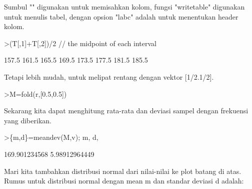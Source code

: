 \documentclass{article}
\begin{document}
\begin{eulernotebook}
\begin{eulercomment}
\begin{eulercomment}
\begin{eulercomment}
Sumbul "\textbar{}" digunakan untuk memisahkan kolom, fungsi "writetable"
digunakan untuk menulis tabel, dengan opsion "labc" adalah untuk
menentukan header kolom.
\end{eulercomment}
\begin{eulerprompt}
>(T[,1]+T[,2])/2 // the midpoint of each interval
\end{eulerprompt}
\begin{euleroutput}
          157.5 
          161.5 
          165.5 
          169.5 
          173.5 
          177.5 
          181.5 
          185.5 
\end{euleroutput}
\begin{eulercomment}
Tetapi lebih mudah, untuk melipat rentang dengan vektor [1/2.1/2].
\end{eulercomment}
\begin{eulerprompt}
>M=fold(r,[0.5,0.5])
\end{eulerprompt}
\begin{euleroutput}
  [157.5,  161.5,  165.5,  169.5,  173.5,  177.5,  181.5,  185.5]
\end{euleroutput}
\begin{eulercomment}
Sekarang kita dapat menghitung rata-rata dan deviasi sampel dengan
frekuensi yang diberikan.
\end{eulercomment}
\begin{eulerprompt}
>\{m,d\}=meandev(M,v); m, d,
\end{eulerprompt}
\begin{euleroutput}
  169.901234568
  5.98912964449
\end{euleroutput}
\begin{eulercomment}
Mari kita tambahkan distribusi normal dari nilai-nilai ke plot batang
di atas. Rumus untuk distribusi normal dengan mean m dan standar
deviasi d adalah:


\end{eulercomment}
\end{eulercomment}
\end{eulercomment}
\end{eulernotebook}
\end{document}
